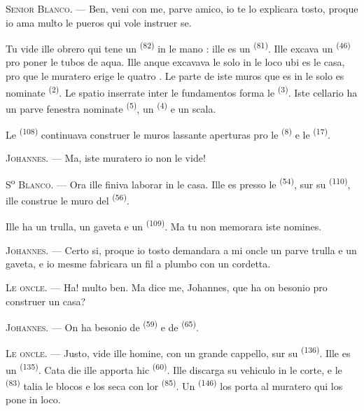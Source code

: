 \VUsaut{3.0mm}

\textsc{Senior Blanco}. --- Ben, veni con me, parve amico, io te lo explicara
tosto, proque io ama multo le pueros qui vole instruer se.

Tu vide ille obrero qui tene un  \textsuperscript{(82)} in le mano
: ille es un  \textsuperscript{(81)}. Ille excava un
 \textsuperscript{(46)} pro poner le tubos de aqua. Ille anque
excavava le solo in le loco ubi es le casa, pro que le muratero erige le quatro
. Le parte de iste muros que es in le solo es nominate
 \textsuperscript{(2)}. Le spatio inserrate inter le
fundamentos forma le  \textsuperscript{(3)}. Iste cellario ha
un parve fenestra nominate 
\textsuperscript{(5)}, un  \textsuperscript{(4)} e un scala.

Le  \textsuperscript{(108)} continuava construer le muros
lassante aperturas pro le  \textsuperscript{(8)} e le
 \textsuperscript{(17)}.

\textsc{Johannes}. --- Ma, iste muratero io non le vide!

S\textsuperscript{o} \textsc{Blanco}. --- Ora ille finiva laborar in le casa.
Ille es presso le  \textsuperscript{(54)}, sur su
 \textsuperscript{(110)}, ille construe le muro del
 \textsuperscript{(56)}.

Ille ha un trulla, un gaveta e un  \textsuperscript{(109)}.
Ma tu non memorara iste nomines.

\textsc{Johannes}. --- Certo si, proque io tosto demandara a mi oncle un parve
trulla e un gaveta, e io mesme fabricara un fil a plumbo con un cordetta.

\VUsaut{3.0mm}
\VUsaut{3.0mm}

\textsc{Le oncle}. --- Ha! multo ben. Ma dice me, Johannes, que ha on besonio
pro construer un casa?

\textsc{Johannes}. --- On ha besonio de 
\textsuperscript{(59)} e de  \textsuperscript{(65)}.

\textsc{Le oncle}. --- Justo, vide ille homine, con un grande cappello, sur su
 \textsuperscript{(136)}. Ille es un 
\textsuperscript{(135)}. Cata die ille apporta hic 
\textsuperscript{(60)}. Ille discarga su vehiculo in le corte, e le
 \textsuperscript{(83)} talia le blocos e los seca con lor
 \textsuperscript{(85)}. Un 
\textsuperscript{(146)} los porta al muratero qui los pone in loco.

